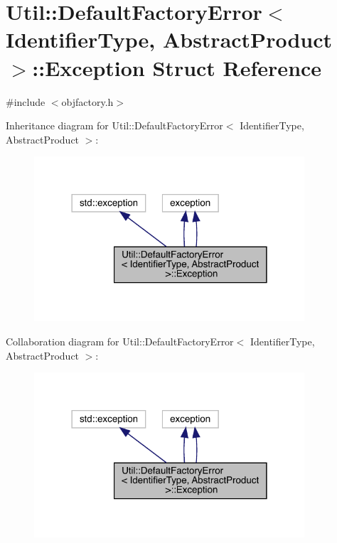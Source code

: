 \hypertarget{structUtil_1_1DefaultFactoryError_1_1Exception}{}\section{Util\+:\+:Default\+Factory\+Error$<$ Identifier\+Type, Abstract\+Product $>$\+:\+:Exception Struct Reference}
\label{structUtil_1_1DefaultFactoryError_1_1Exception}


{\ttfamily \#include $<$objfactory.\+h$>$}



Inheritance diagram for Util\+:\+:Default\+Factory\+Error$<$ Identifier\+Type, Abstract\+Product $>$\+:
\nopagebreak
\begin{figure}[H]
\begin{center}
\leavevmode
\includegraphics[width=285pt]{df/df3/structUtil_1_1DefaultFactoryError_1_1Exception__inherit__graph}
\end{center}
\end{figure}


Collaboration diagram for Util\+:\+:Default\+Factory\+Error$<$ Identifier\+Type, Abstract\+Product $>$\+:
\nopagebreak
\begin{figure}[H]
\begin{center}
\leavevmode
\includegraphics[width=285pt]{d6/dbd/structUtil_1_1DefaultFactoryError_1_1Exception__coll__graph}
\end{center}
\end{figure}
